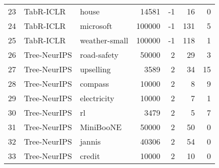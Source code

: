\begin{table}[]
{\begin{tabular}{rllrrrr}
23                     & TabR-ICLR    & house                                            & 14581                   & -1                      & 16                      & 0                       \\
24                     & TabR-ICLR    & microsoft                                        & 100000                  & -1                      & 131                     & 5                       \\
25                     & TabR-ICLR    & weather-small                                    & 100000                  & -1                      & 118                     & 1                       \\
\midrule
26                     & Tree-NeurIPS & road-safety                                      & 50000                   & 2                       & 29                      & 3                       \\
27                     & Tree-NeurIPS & upselling                                        & 3589                    & 2                       & 34                      & 15                      \\
28                     & Tree-NeurIPS & compass                                          & 10000                   & 2                       & 8                       & 9                       \\
29                     & Tree-NeurIPS & electricity                                      & 10000                   & 2                       & 7                       & 1                       \\
30                     & Tree-NeurIPS & rl                                               & 3479                    & 2                       & 5                       & 7                       \\
31                     & Tree-NeurIPS & MiniBooNE                                        & 50000                   & 2                       & 50                      & 0                       \\
32                     & Tree-NeurIPS & jannis                                           & 40306                   & 2                       & 54                      & 0                       \\
33                     & Tree-NeurIPS & credit                                           & 10000                   & 2                       & 10                      & 0                       \\

\end{tabular}}
\end{table}
